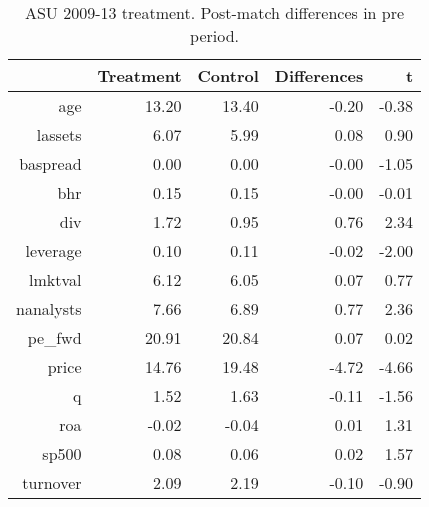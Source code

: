 \begin{table}[ht]
\centering
\caption{ASU 2009-13 treatment. Post-match differences in pre period.} 
\begin{tabular}{rrrrr}
  \hline
 & Treatment & Control & Differences & t \\ 
  \hline
age & 13.20 & 13.40 & -0.20 & -0.38 \\ 
  lassets & 6.07 & 5.99 & 0.08 & 0.90 \\ 
  baspread & 0.00 & 0.00 & -0.00 & -1.05 \\ 
  bhr & 0.15 & 0.15 & -0.00 & -0.01 \\ 
  div & 1.72 & 0.95 & 0.76 & 2.34 \\ 
  leverage & 0.10 & 0.11 & -0.02 & -2.00 \\ 
  lmktval & 6.12 & 6.05 & 0.07 & 0.77 \\ 
  nanalysts & 7.66 & 6.89 & 0.77 & 2.36 \\ 
  pe\_fwd & 20.91 & 20.84 & 0.07 & 0.02 \\ 
  price & 14.76 & 19.48 & -4.72 & -4.66 \\ 
  q & 1.52 & 1.63 & -0.11 & -1.56 \\ 
  roa & -0.02 & -0.04 & 0.01 & 1.31 \\ 
  sp500 & 0.08 & 0.06 & 0.02 & 1.57 \\ 
  turnover & 2.09 & 2.19 & -0.10 & -0.90 \\ 
   \hline
\end{tabular}
\end{table}
